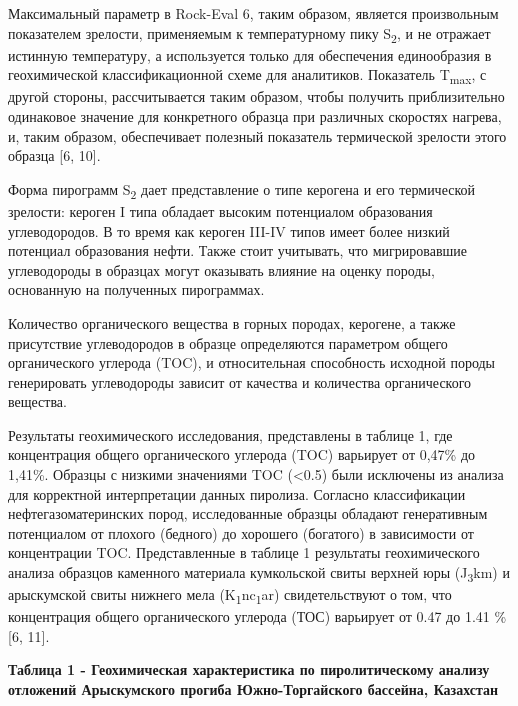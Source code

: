 Максимальный параметр в Rock-Eval 6, таким образом, является
произвольным показателем зрелости, применяемым к температурному пику
S\textsubscript{2}, и не отражает истинную температуру, а используется
только для обеспечения единообразия в геохимической классификационной
схеме для аналитиков. Показатель T\textsubscript{max}, с другой стороны,
рассчитывается таким образом, чтобы получить приблизительно одинаковое
значение для конкретного образца при различных скоростях нагрева, и,
таким образом, обеспечивает полезный показатель термической зрелости
этого образца {[}6, 10{]}.

Форма пирограмм S\textsubscript{2} дает представление о типе керогена и
его термической зрелости: кероген I типа обладает высоким потенциалом
образования углеводородов. В то время как кероген III-IV типов имеет
более низкий потенциал образования нефти. Также стоит учитывать, что
мигрировавшие углеводороды в образцах могут оказывать влияние на оценку
породы, основанную на полученных пирограммах.

Количество органического вещества в горных породах, керогене, а также
присутствие углеводородов в образце определяются параметром общего
органического углерода (TOC), и относительная способность исходной
породы генерировать углеводороды зависит от качества и количества
органического вещества.

Результаты геохимического исследования, представлены в таблице 1, где
концентрация общего органического углерода (TOC) варьирует от 0,47\% до
1,41\%. Образцы с низкими значениями TOC (\textless0.5) были исключены
из анализа для корректной интерпретации данных пиролиза. Согласно
классификации нефтегазоматеринских пород, исследованные образцы обладают
генеративным потенциалом от плохого (бедного) до хорошего (богатого) в
зависимости от концентрации TOC. Представленные в таблице 1 результаты
геохимического анализа образцов каменного материала кумкольской свиты
верхней юры (J\textsubscript{3}km) и арыскумской свиты нижнего мела
(K\textsubscript{1}nc\textsubscript{1}ar) свидетельствуют о том, что
концентрация общего органического углерода (ТОС) варьирует от 0.47 до
1.41 \% {[}6, 11{]}.

{\bfseries Таблица 1 - Геохимическая характеристика по пиролитическому
анализу отложений Арыскумского прогиба Южно-Торгайского бассейна,
Казахстан}


